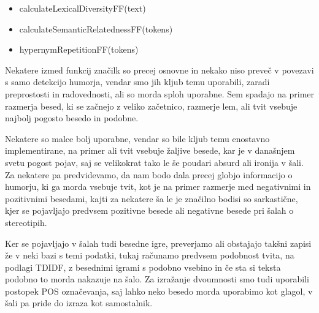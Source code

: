 \documentclass[a4paper]{article}
\begin{document}
\begin{itemize}
	\item calculateLexicalDiversityFF(text)
	\item calculateSemanticRelatednessFF(tokens)
	\item hypernymRepetitionFF(tokens)
\end{itemize}



Nekatere izmed funkcij značilk so precej osnovne in nekako niso preveč v povezavi s samo detekcijo humorja, vendar smo jih kljub temu uporabili, zaradi preprostosti in radovednosti, ali so morda sploh uporabne. Sem spadajo na primer razmerja besed, ki se začnejo z veliko začetnico, razmerje lem, ali tvit vsebuje najbolj pogosto besedo in podobne. 

Nekatere so malce bolj uporabne, vendar so bile kljub temu enostavno implementirane, na primer ali tvit vsebuje žaljive besede, kar je v današnjem svetu pogost pojav, saj se velikokrat tako le še poudari absurd ali ironija v šali. Za nekatere pa predvidevamo, da nam bodo dala precej globjo informacijo o humorju, ki ga morda vsebuje tvit, kot je na primer razmerje med negativnimi in pozitivnimi besedami, kajti za nekatere ša le je značilno bodisi so sarkastične, kjer se pojavljajo predvsem pozitivne besede ali negativne besede pri šalah o stereotipih. 

Ker se pojavljajo v šalah tudi besedne igre, preverjamo ali obstajajo takšni zapisi že v neki bazi s temi podatki, tukaj računamo predvsem podobnost tvita, na podlagi TDIDF, z besednimi igrami s podobno vsebino in če sta si teksta podobno to morda nakazuje na šalo. Za izražanje dvoumnosti smo tudi uporabili postopek POS označevanja, saj lahko neko besedo morda uporabimo kot glagol, v šali pa pride do izraza kot samostalnik.
\end{document}

